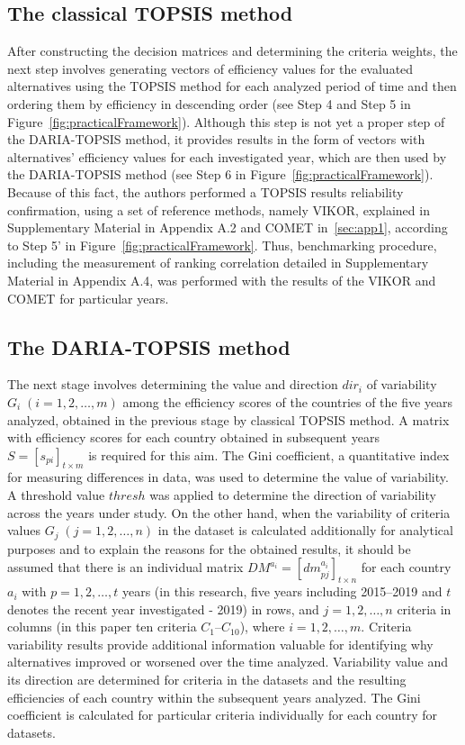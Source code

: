 \documentclass[5p,times]{elsarticle}
\begin{document}
\subsection{The classical TOPSIS method}
After constructing the decision matrices and determining the criteria weights, the next step involves generating vectors of efficiency values for the evaluated alternatives using the TOPSIS method for each analyzed period of time and then ordering them by efficiency in descending order (see Step 4 and Step 5 in Figure~\ref{fig:practicalFramework}). Although this step is not yet a proper step of the DARIA-TOPSIS method, it provides results in the form of vectors with alternatives' efficiency values for each investigated year, which are then used by the DARIA-TOPSIS method (see Step 6 in Figure~\ref{fig:practicalFramework}). Because of this fact, the authors performed a TOPSIS results reliability confirmation, using a set of reference methods, namely VIKOR, explained in Supplementary Material in Appendix A.2 and COMET in~\ref{sec:app1}, according to Step 5' in Figure~\ref{fig:practicalFramework}. Thus, benchmarking procedure, including the measurement of ranking correlation detailed in Supplementary Material in Appendix A.4, was performed with the results of the VIKOR and COMET for particular years.

\subsection{The DARIA-TOPSIS method}
The next stage involves determining the value and direction $dir_{i}$ of variability $G_{i} \; (i = 1, 2, \ldots, m)$ among the efficiency scores of the countries of the five years analyzed, obtained in the previous stage by classical TOPSIS method. A matrix with efficiency scores for each country obtained in subsequent years $S = [s_{pi}]_{t \times m}$ is required for this aim. The Gini coefficient, a quantitative index for measuring differences in data, was used to determine the value of variability. A threshold value $thresh$ was applied to determine the direction of variability across the years under study.
%
On the other hand, when the variability of criteria values $G_{j} \; (j = 1, 2, \ldots, n)$ in the dataset is calculated additionally for analytical purposes and to explain the reasons for the obtained results, it should be assumed that there is an individual matrix $DM^{a_{i}} = [dm^{a_{i}}_{pj}]_{t \times n}$ for each country $a_{i}$ with $p = 1, 2, \ldots, t$ years (in this research, five years including 2015--2019 and $t$ denotes the recent year investigated - 2019) in rows, and $j = 1, 2, \ldots, n$ criteria in columns (in this paper ten criteria $C_1$--$C_{10}$), where $i = 1, 2, \ldots, m$. Criteria variability results provide additional information valuable for identifying why alternatives improved or worsened over the time analyzed.
%
Variability value and its direction are determined for criteria in the datasets and the resulting efficiencies of each country within the subsequent years analyzed. The Gini coefficient is calculated for particular criteria individually for each country for datasets.
\end{document}
